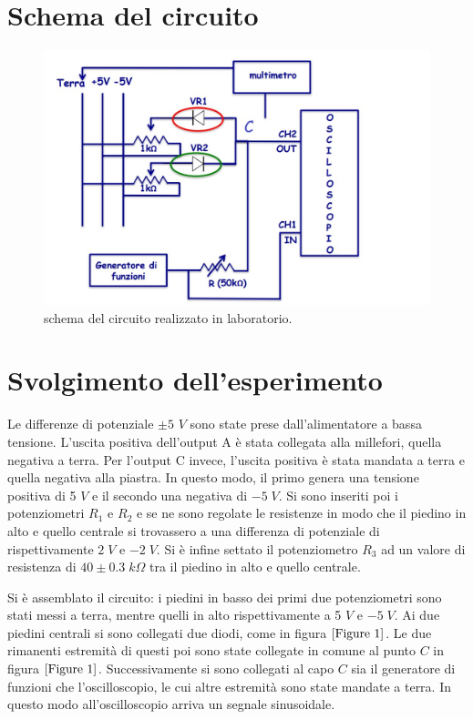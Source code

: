 \documentclass[11pt]{article}
\begin{document}
	\section{Schema del circuito}
	\begin{figure}[H]
		\includegraphics[scale=0.5]{Circuito.JPG}
		\caption{ schema del circuito realizzato in laboratorio.}
		\label{Figure 1}
	\end{figure}

		
	\section{Svolgimento dell'esperimento}
	Le differenze di potenziale $\pm 5$ $V$ sono state prese dall'alimentatore a bassa tensione. L'uscita positiva dell'output A è stata collegata alla millefori, quella negativa a terra. Per l'output C invece, l'uscita positiva è stata mandata a terra e quella negativa alla piastra.
	In questo modo, il primo genera una tensione positiva di 5 $V$ e il secondo una negativa di $-5 \; V$. Si sono inseriti poi i potenziometri $R_1$ e $R_2$ e se ne sono regolate le resistenze in modo che il piedino in alto e quello centrale si trovassero a una differenza di potenziale di rispettivamente $2 \; V$ e $-2 \; V$. Si è infine settato il potenziometro $R_3$ ad un valore di resistenza di $40 \pm  0.3\; k\Omega$ tra il piedino in alto e quello centrale.
	
	Si è assemblato il circuito: i piedini in basso dei primi due potenziometri sono stati messi a terra, mentre quelli in alto rispettivamente a 5 $V$ e $-5 \; V$. Ai due piedini centrali si sono collegati due diodi, come in figura $\ref{Figure 1}$. Le due rimanenti estremità di questi poi sono state collegate in comune al punto $C$ in figura $\ref{Figure 1}$. Successivamente si sono collegati al capo $C$ sia il generatore di funzioni che l'oscilloscopio, le cui altre estremità sono state mandate a terra. In questo modo all'oscilloscopio arriva un segnale sinusoidale.
	
\end{document}
